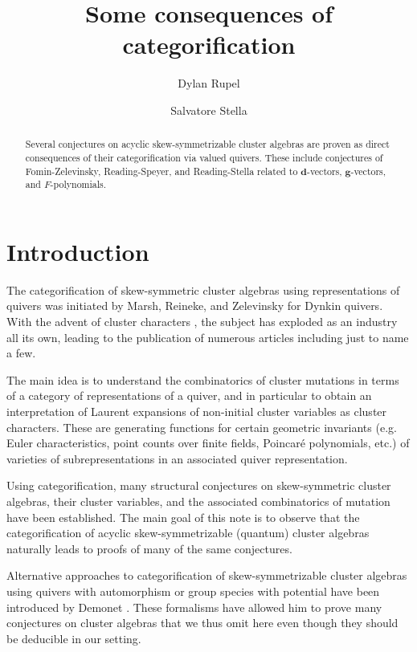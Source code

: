 \documentclass[12pt]{amsart}
\title{Some consequences of categorification}
\author[Rupel]{Dylan Rupel}
\author[Stella]{Salvatore Stella}
\newcommand{\sayS}[1]{\say[S]{#1}}
\newcommand{\bfd}{\mathbf{d}}
\newcommand{\bfg}{\mathbf{g}}
\begin{document}
\begin{abstract}
  Several conjectures on acyclic skew-symmetrizable cluster algebras are proven as direct consequences of their categorification via valued quivers.
  These include conjectures of Fomin-Zelevinsky, Reading-Speyer, and Reading-Stella related to $\bfd$-vectors, $\bfg$-vectors, and $F$-polynomials.
\end{abstract}
\maketitle

\section{Introduction}
  The categorification of skew-symmetric cluster algebras using representations of quivers was initiated by Marsh, Reineke, and Zelevinsky \cite{marsh-reineke-zelevinsky} for Dynkin quivers.  
  With the advent of cluster characters \cite{caldero-chapoton}, the subject has exploded as an industry all its own, leading to the publication of numerous articles including \cite{caldero-chapoton-schiffler,buan-marsh-reineke-reiten-todorov,derksen-weyman-zelevinsky,geiss-leclerc-schroer,caldero-keller,caldero-keller2,plamondon,palu,rupel1,qin,rupel2} just to name a few.  

  The main idea is to understand the combinatorics of cluster mutations in terms of a category of representations of a quiver, and in particular to obtain an interpretation of Laurent expansions of non-initial cluster variables as cluster characters.
 These are generating functions for certain geometric invariants (e.g. Euler characteristics, point counts over finite fields, Poincar\'e polynomials, etc.) of varieties of subrepresentations in an associated quiver representation.
  
  Using categorification, many structural conjectures on skew-symmetric cluster algebras, their cluster variables, and the associated combinatorics of mutation have been established.
  The main goal of this note is to observe that the categorification of acyclic skew-symmetrizable (quantum) cluster algebras \cite{rupel1,rupel2} naturally leads to proofs of many of the same conjectures.

  Alternative approaches to categorification of skew-symmetrizable cluster algebras using quivers with automorphism or group species with potential have been introduced by Demonet \cite{demonet1,demonet2}. 
  \sayS{Shall we cite Daniel?}
  These formalisms have allowed him to prove many conjectures on cluster algebras that we thus omit here even though they should be deducible in our setting.
\end{document}
